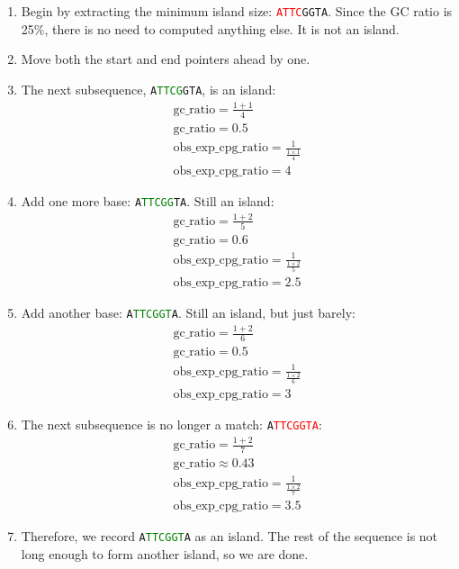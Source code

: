 \documentclass{bioinfo}
\newcommand{\dnaseq}[1]{\texttt{#1}}
\newcommand{\match}[1]{\textcolor{green}{#1}}
\newcommand{\nomatch}[1]{\textcolor{red}{#1}}
\begin{document}
\begin{enumerate}
\item Begin by extracting the minimum island size:
  \dnaseq{\nomatch{ATTC}GGTA}. Since the GC ratio is 25\%, there is
  no need to computed anything else. It is not an island.
\item Move both the start and end pointers ahead by one.
\item The next subsequence, \dnaseq{A\match{TTCG}GTA}, is an island:
  \begin{eqnarray*}
    \mbox{gc\_ratio} = \frac{1 + 1}{4} \\
    \mbox{gc\_ratio} = 0.5 \\
    \mbox{obs\_exp\_cpg\_ratio} = \frac{1}{\frac{1 \times 1}{4}} \\
    \mbox{obs\_exp\_cpg\_ratio} = 4
  \end{eqnarray*}
\item Add one more base: \dnaseq{A\match{TTCGG}TA}. Still an island:
  \begin{eqnarray*}
    \mbox{gc\_ratio} = \frac{1 + 2}{5} \\
    \mbox{gc\_ratio} = 0.6 \\
    \mbox{obs\_exp\_cpg\_ratio} = \frac{1}{\frac{1 \times 2}{5}} \\
    \mbox{obs\_exp\_cpg\_ratio} = 2.5
  \end{eqnarray*}
\item Add another base: \dnaseq{A\match{TTCGGT}A}. Still an island,
  but just barely:
  \begin{eqnarray*}
    \mbox{gc\_ratio} = \frac{1 + 2}{6} \\
    \mbox{gc\_ratio} = 0.5 \\
    \mbox{obs\_exp\_cpg\_ratio} = \frac{1}{\frac{1 \times 2}{6}} \\
    \mbox{obs\_exp\_cpg\_ratio} = 3
  \end{eqnarray*}
\item The next subsequence is no longer a match: \dnaseq{A\nomatch{TTCGGTA}}:
  \begin{eqnarray*}
    \mbox{gc\_ratio} = \frac{1 + 2}{7} \\
    \mbox{gc\_ratio} \approx 0.43 \\
    \mbox{obs\_exp\_cpg\_ratio} = \frac{1}{\frac{1 \times 2}{7}} \\
    \mbox{obs\_exp\_cpg\_ratio} = 3.5
  \end{eqnarray*}
\item Therefore, we record \dnaseq{A\match{TTCGGT}A} as an island. The
  rest of the sequence is not long enough to form another island, so
  we are done.
\end{enumerate}
\end{document}
